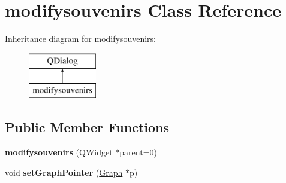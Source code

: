 \hypertarget{classmodifysouvenirs}{}\section{modifysouvenirs Class Reference}
\label{classmodifysouvenirs}
Inheritance diagram for modifysouvenirs\+:\begin{figure}[H]
\begin{center}
\leavevmode
\includegraphics[height=2.000000cm]{classmodifysouvenirs}
\end{center}
\end{figure}
\subsection*{Public Member Functions}
\begin{DoxyCompactItemize}
\item 
\mbox{\label{classmodifysouvenirs_ae8cf83ce05a01274522a341a8e081928}} 
{\bfseries modifysouvenirs} (Q\+Widget $\ast$parent=0)
\item 
\mbox{\label{classmodifysouvenirs_ad15ff72e8ed3361501972a0927f687ab}} 
void {\bfseries set\+Graph\+Pointer} (\hyperlink{class_graph}{Graph} $\ast$p)
\end{DoxyCompactItemize}

